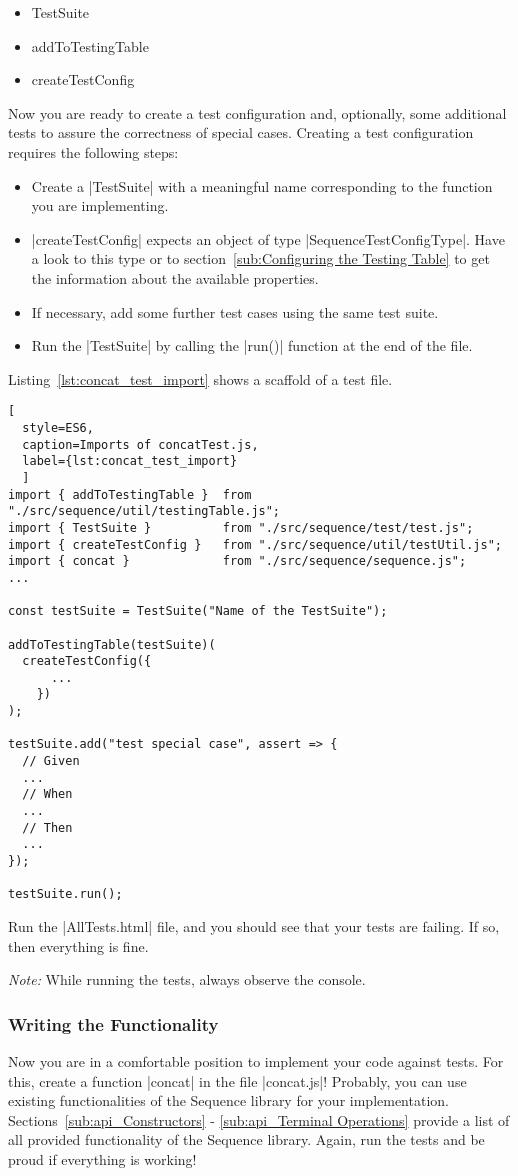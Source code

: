 \begin{itemize}
  \item{TestSuite}
  \item{addToTestingTable}
  \item{createTestConfig}
\end{itemize}
Now you are ready to create a test configuration and, optionally, some
additional tests to assure the correctness of special cases. Creating a test
configuration requires the following steps:

\begin{itemize}
  \item{Create a |TestSuite| with a meaningful name corresponding to the function you are implementing.}
  \item{|createTestConfig| expects an object of type |SequenceTestConfigType|. Have a look
    to this type or to section~\ref{sub:Configuring the Testing Table} to get the information about the available properties. }
      \item{If necessary, add some further test cases using the same test suite.}
  \item{Run the |TestSuite| by calling the |run()| function at the end of the file. }
\end{itemize}

Listing~\ref{lst:concat_test_import} shows a scaffold of a test file. 

\begin{lstlisting}[
  style=ES6, 
  caption=Imports of concatTest.js,
  label={lst:concat_test_import}
  ]
import { addToTestingTable }  from "./src/sequence/util/testingTable.js";
import { TestSuite }          from "./src/sequence/test/test.js";
import { createTestConfig }   from "./src/sequence/util/testUtil.js";
import { concat }             from "./src/sequence/sequence.js";
...

const testSuite = TestSuite("Name of the TestSuite");

addToTestingTable(testSuite)(
  createTestConfig({
      ...
    })
);

testSuite.add("test special case", assert => {
  // Given
  ...
  // When
  ...
  // Then
  ...
});

testSuite.run();
\end{lstlisting}

Run the |AllTests.html| file, and you should see that your tests are failing.
If so, then everything is fine.

\textit{Note:} While running the tests, always observe the console.

\subsubsection{Writing the Functionality}
\label{subsub:Write the Functionality}
Now you are in a comfortable position to implement your code against tests.
For this, create a function |concat| in the file |concat.js|!
Probably, you can use existing functionalities of the Sequence library for your
implementation. Sections~\ref{sub:api_Constructors} - \ref{sub:api_Terminal
Operations} provide a list of all provided functionality of the Sequence
library.
\newline
Again, run the tests and be proud if everything is working!
